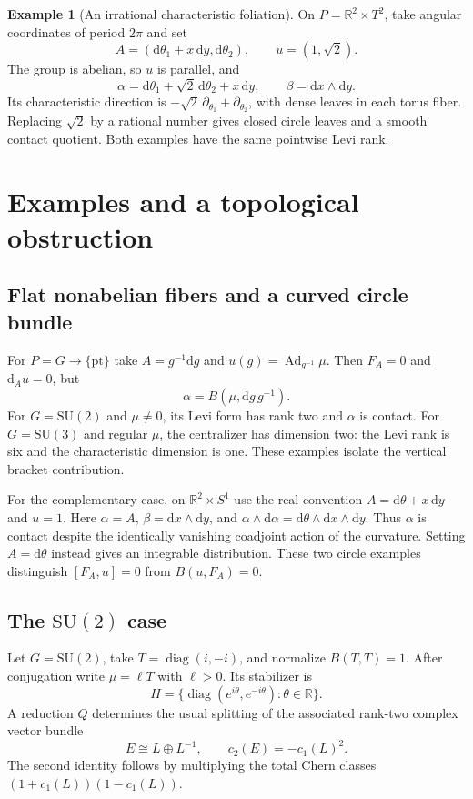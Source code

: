 \documentclass[11pt,a4paper]{article}
\numberwithin{equation}{section}
\theoremstyle{definition}
\newtheorem{example}[theorem]{Example}
\theoremstyle{remark}
\newcommand{\Ad}{\operatorname{Ad}}
\newcommand{\R}{\mathbb R}
\newcommand{\SU}{\mathrm{SU}}
\newcommand{\dd}{\mathrm d}
\begin{document}
\begin{example}[An irrational characteristic foliation]\label{ex:irrational}
On $P=\R^2\times T^2$, take angular coordinates of period $2\pi$ and set
\[
 A=(\dd\theta_1+x\,\dd y,\dd\theta_2),\qquad
 u=(1,\sqrt2).
\]
The group is abelian, so $u$ is parallel, and
\[
 \alpha=\dd\theta_1+\sqrt2\,\dd\theta_2+x\,\dd y,
 \qquad\beta=\dd x\wedge\dd y.
\]
Its characteristic direction is
$-\sqrt2\,\partial_{\theta_1}+\partial_{\theta_2}$, with dense leaves in
each torus fiber. Replacing $\sqrt2$ by a rational number gives closed
circle leaves and a smooth contact quotient. Both examples have the same
pointwise Levi rank.
\end{example}

\section{Examples and a topological obstruction}
\label{sec:examples}

\subsection{Flat nonabelian fibers and a curved circle bundle}

For $P=G\to\{\mathrm{pt}\}$ take
$A=g^{-1}\dd g$ and $u(g)=\Ad_{g^{-1}}\mu$. Then $F_A=0$ and
$\dd_Au=0$, but
\[
 \alpha=B(\mu,\dd g\,g^{-1}).
\]
For $G=\SU(2)$ and $\mu\ne0$, its Levi form has rank two and $\alpha$
is contact. For $G=\SU(3)$ and regular $\mu$, the centralizer has
dimension two: the Levi rank is six and the characteristic dimension is
one. These examples isolate the vertical bracket contribution.

For the complementary case, on $\R^2\times S^1$ use the real convention
$A=\dd\theta+x\,\dd y$ and $u=1$. Here $\alpha=A$,
$\beta=\dd x\wedge\dd y$, and
$\alpha\wedge\dd\alpha=\dd\theta\wedge\dd x\wedge\dd y$.
Thus $\alpha$ is contact despite the identically vanishing coadjoint action
of the curvature. Setting $A=\dd\theta$ instead gives an integrable
distribution. These two circle examples distinguish $[F_A,u]=0$ from
$B(u,F_A)=0$.

\subsection{The \texorpdfstring{$\SU(2)$}{SU(2)} case}

Let $G=\SU(2)$, take
$T=\operatorname{diag}(i,-i)$, and normalize $B(T,T)=1$.
After conjugation write $\mu=\ell T$ with $\ell>0$. Its stabilizer is
\[
 H=\{\operatorname{diag}(e^{i\theta},e^{-i\theta}):\theta\in\R\}.
\]
A reduction $Q$ determines the usual splitting of the associated
rank-two complex vector bundle
\begin{equation}\label{eq:chern}
 E\cong L\oplus L^{-1},\qquad c_2(E)=-c_1(L)^2.
\end{equation}
The second identity follows by multiplying the total Chern classes
$(1+c_1(L))(1-c_1(L))$.
\end{document}
